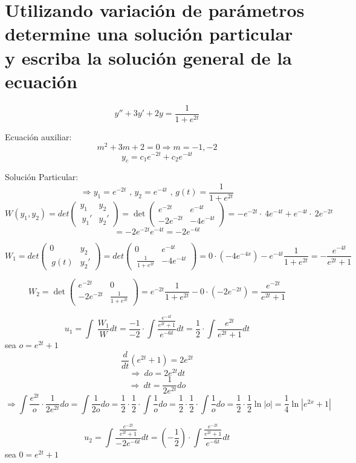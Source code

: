 \section{Utilizando variación de parámetros determine una solución particular
y escriba la solución general de la ecuación}

$$y''+3y'+2y=\frac{1}{1+e^{2t}}$$

Ecuación auxiliar:
$$m^2+3m+2=0 \Rightarrow m=-1,-2$$
$$y_c=c_1e^{-2t}+c_2e^{-4t}$$

Solución Particular:
$$\Rightarrow y_1=e^{-2t} \mbox{ , } y_2=e^{-4t}  \mbox{ , } g(t)=\frac{1}{1+e^{2t}}$$
$$W(y_1, y_2)=det\begin{pmatrix}y_1&y_2\\ \:y_1'&y_2'\end{pmatrix}=\det \begin{pmatrix}e^{-2t}&e^{-4t}\\ -2e^{-2t}&-4e^{-4t}\end{pmatrix}=-e^{-2t}\cdot \:4e^{-4t}+e^{-4t}\cdot \:2e^{-2t}$$
$$=-2e^{-2t}e^{-4t}=-2e^{-6t}$$

$$W_1=det\begin{pmatrix}0&y_2\\ \:g\left(t\right)&y_2'\end{pmatrix}=det\begin{pmatrix}0&e^{-4t}\\ \:\frac{1}{1+e^{2t}}&-4e^{-4t}\end{pmatrix}=0\cdot \left(-4e^{-4x}\right)-e^{-4t}\frac{1}{1+e^{2t}}=-\frac{e^{-4t}}{e^{2t}+1}$$


$$W_2=\det \begin{pmatrix}e^{-2t}&0\\ -2e^{-2t}&\frac{1}{1+e^{2t}}\end{pmatrix}=e^{-2t}\frac{1}{1+e^{2t}}-0\cdot \left(-2e^{-2t}\right)=\frac{e^{-2t}}{e^{2t}+1}$$

$$u_1=\int \:\frac{W_1}{W}dt=\frac{-1}{-2}\cdot \int \frac{\frac{e^{-4t}}{e^{2t}+1}}{e^{-6t}}dt=\frac{1}{2}\cdot \int \frac{e^{2t}}{e^{2t}+1}dt$$
sea $o=e^{2t}+1$
$$\frac{d}{dt}\left(e^{2t}+1\right)=2e^{2t}$$
$$\Rightarrow \:do=2e^{2t}dt$$
$$\Rightarrow \:dt=\frac{1}{2e^{2t}}do$$
$$\Rightarrow\int \frac{e^{2t}}{o}\cdot \frac{1}{2e^{2t}}do=\int \frac{1}{2o}do=\frac{1}{2}\cdot \frac{1}{2}\cdot \int \frac{1}{o}do=\frac{1}{2}\cdot \frac{1}{2}\cdot \int \frac{1}{o}do=\frac{1}{2}\cdot \frac{1}{2}\ln \left|o\right|=\frac{1}{4}\ln \left|e^{2x}+1\right|$$

$$u_2=\int \frac{\frac{e^{-2t}}{e^{2t}+1}}{-2e^{-6t}}dt=\left(-\frac{1}{2}\right)\cdot \int \frac{\frac{e^{-2t}}{e^{2t}+1}}{e^{-6t}}dt$$
sea $0=e^{2t}+1$

